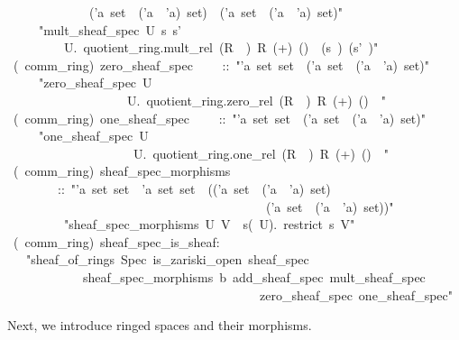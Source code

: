 \documentclass[12pt]{scrartcl}
\begin{document}
\begin{isabelle}
\ \ \ \ \ \ \ \ \ \ \ \ \isasymRightarrow \ ('a\ set\ \isasymRightarrow \ ('a\ \isasymtimes \ 'a)\ set)\ \isasymRightarrow \ ('a\ set\ \isasymRightarrow \ ('a\ \isasymtimes \ 'a)\ set)"\isanewline
\ \ \ \ \ "mult\_sheaf\_spec\ U\ s\ s'\ \isasymequiv \ \isanewline
\ \ \ \ \ \ \ \ \ \isasymlambda \isasympp \isasymin U.\ quotient\_ring.mult\_rel\ (R\ \isasymsetminus \ \isasympp )\ R\ (+)\ (\isasymcdot )\ \isasymzero \ (s\ \isasympp )\ (s'\ \isasympp )"\isanewline
\isanewline
{}\ (\ comm\_ring)\ zero\_sheaf\_spec\isanewline
\ \ \ \ ::\ "'a\ set\ set\ \isasymRightarrow \ ('a\ set\ \isasymRightarrow \ ('a\ \isasymtimes \ 'a)\ set)"\isanewline
\ \ \ \ \ "zero\_sheaf\_spec\ U\ \isasymequiv \ \isanewline
\ \ \ \ \ \ \ \ \ \ \ \ \ \ \ \ \ \ \ \isasymlambda \isasympp \isasymin U.\ quotient\_ring.zero\_rel\ (R\ \isasymsetminus \ \isasympp )\ R\ (+)\ (\isasymcdot )\ \isasymzero \ \isasymone "\isanewline
\isanewline
{}\ (\ comm\_ring)\ one\_sheaf\_spec\isanewline
\ \ \ \ ::\ "'a\ set\ set\ \isasymRightarrow \ ('a\ set\ \isasymRightarrow \ ('a\ \isasymtimes \ 'a)\ set)"\isanewline
\ \ \ \ \ "one\_sheaf\_spec\ U\ \isasymequiv \ \isanewline
\ \ \ \ \ \ \ \ \ \ \ \ \ \ \ \ \ \ \ \ \isasymlambda \isasympp \isasymin U.\ quotient\_ring.one\_rel\ (R\ \isasymsetminus \ \isasympp )\ R\ (+)\ (\isasymcdot )\ \isasymzero \ \isasymone "\isanewline
\isanewline
{}\ (\ comm\_ring)\ sheaf\_spec\_morphisms\isanewline
\ \ \ \ \ \ \ \ ::\ "'a\ set\ set\ \isasymRightarrow \ 'a\ set\ set\ \isasymRightarrow \ (('a\ set\ \isasymRightarrow \ ('a\ \isasymtimes \ 'a)\ set)\ \isanewline
\ \ \ \ \ \ \ \ \ \ \ \ \ \ \ \ \ \ \ \ \ \ \ \ \ \ \ \ \ \ \ \ \ \ \ \ \ \ \ \ \isasymRightarrow \ ('a\ set\ \isasymRightarrow \ ('a\ \isasymtimes \ 'a)\ set))"\isanewline
\ \ \ \ \ \ \ \ \ "sheaf\_spec\_morphisms\ U\ V\ \isasymequiv \ \isasymlambda s\isasymin (\isasymO \ U).\ restrict\ s\ V"\isanewline
\isanewline
{}\ (\ comm\_ring)\ sheaf\_spec\_is\_sheaf:\isanewline
\ \ \ "sheaf\_of\_rings\ Spec\ is\_zariski\_open\ sheaf\_spec\ \isanewline
\ \ \ \ \ \ \ \ \ \ \ \ sheaf\_spec\_morphisms\ \isasymO b\ add\_sheaf\_spec\ mult\_sheaf\_spec\ \isanewline
\ \ \ \ \ \ \ \ \ \ \ \ \ \ \ \ \ \ \ \ \ \ \ \ \ \ \ \ \ \ \ \ \ \ \ \ \ \ \ \ zero\_sheaf\_spec\ one\_sheaf\_spec"
\end{isabelle}

Next, we introduce ringed spaces and their morphisms.
\end{document}
